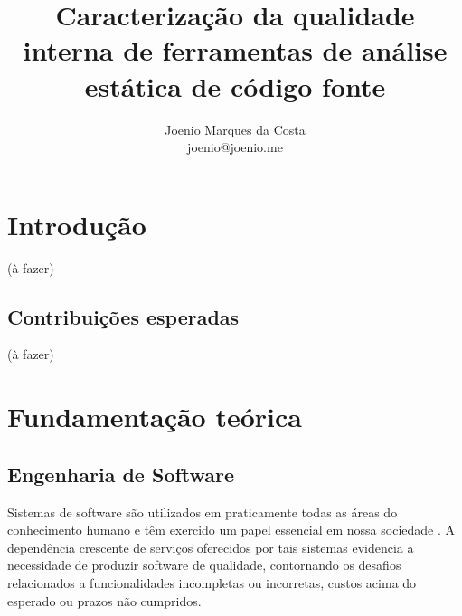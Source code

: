 \documentclass[qual, classic, a4paper]{ufbathesis}
\title{
  Caracterização da qualidade interna de ferramentas de análise estática de
  código fonte
}
\author{Joenio Marques da Costa\\
  {\small joenio@joenio.me}
}
\begin{document}
\frontpage
\frontmatter
\presentationpage

%
%
%
%

\tableofcontents
\listoffigures
\listoftables
\mainmatter

\chapter{Introdução}

(à fazer)


\section{Contribuições esperadas}

(à fazer)

\chapter{Fundamentação teórica}

% 
% 
% 
% 

\section{Engenharia de Software}

Sistemas de software são utilizados em praticamente todas as áreas do
conhecimento humano e têm exercido um papel essencial em nossa sociedade
\cite{Mafra2006}. A dependência crescente de serviços oferecidos por tais
sistemas evidencia a necessidade de produzir software de qualidade,
contornando os  desafios relacionados a funcionalidades incompletas ou
incorretas, custos acima do esperado ou prazos não cumpridos.
\end{document}
